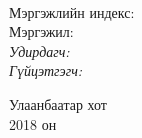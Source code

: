 
\begin{titlepage}
\begin{center}

{\scshape\LARGE \univname\par} %
{\scshape\Large \facname\par}\vspace{0.5cm} %

\vspace{2cm}
\hfill \large{\deptname} \\

\vspace{2cm}

{\huge \bfseries \ttitle\par}\vspace{0.4cm} %

\vspace{2cm}

\begin{minipage}[t] {0.9\textwidth}
\begin{flushleft} 
\normalsize

Мэргэжлийн индекс: \degreeid \\
Мэргэжил: \degreename \\[2cm]

\emph{Удирдагч:} {\supname} \\%
\emph{Гүйцэтгэгч:} {\shortname} \\ %

\end{flushleft}
\end{minipage}

\vfill

\large {Улаанбаатар хот} \\
{\large 2018 он}\\ %

\end{center}
\end{titlepage}

 